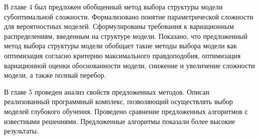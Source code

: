 В главе 4 был предложен обобщенный метод выбора структуры модели субоптимальной сложности. Формализовано понятие параметрической сложности для вероятностных моделей. Сформулированы требования к вариационным распределениям, введенным на структуре модели. Показано, что предложенный метод выбора структуры модели обобщает такие методы выбора модели как оптимизация согласно критерию максимального правдоподобия, оптимизация вариационной оценки обоснованности модели, снижение и увеличение сложности модели, а также полный перебор.

В главе 5 проведен анализ свойств предложенных методов. Описан реализованный программный комплекс, позволяющий осуществлять выбор моделей глубокого обучения. Проведено сравнение предложенных алгоритмов с известными решениями. Предложенные алгоритмы показали более высокие результаты. 


